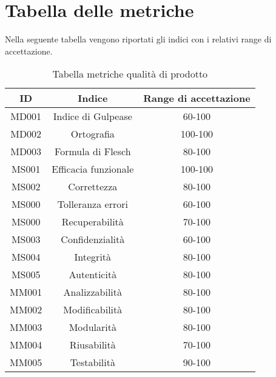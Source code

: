 \section{Tabella delle metriche}
Nella seguente tabella vengono riportati gli indici con i relativi range di accettazione.\\
\begin{table}[h]
    \begin{center}
      \begin{tabular}{|c|c|c|}
        \hline
        \textbf{ID} & \textbf{Indice}       & \textbf{Range di accettazione}\\
        \hline
        MD001       & Indice di Gulpease    & 60-100\\
        MD002       & Ortografia            & 100-100\\
        MD003       & Formula di Flesch     & 80-100\\\hline
        MS001       & Efficacia funzionale  & 100-100\\
        MS002       & Correttezza  			& 80-100\\
        MS000       & Tolleranza errori    & 60-100\\
        MS000       & Recuperabilità			& 70-100\\
        MS003       & Confidenzialità 	 	& 60-100\\
        MS004       & Integrità  			& 80-100\\
        MS005       & Autenticità		    & 80-100\\\hline
        MM001       & Analizzabilità	    & 80-100\\
        MM002       & Modificabilità		& 80-100\\
        MM003       & Modularità		    & 80-100\\
        MM004       & Riusabilità			& 70-100\\
		MM005       & Testabilità			& 90-100\\
        \hline
      \end{tabular}
      \caption{Tabella metriche qualità di prodotto}
    \end{center}
\end{table}